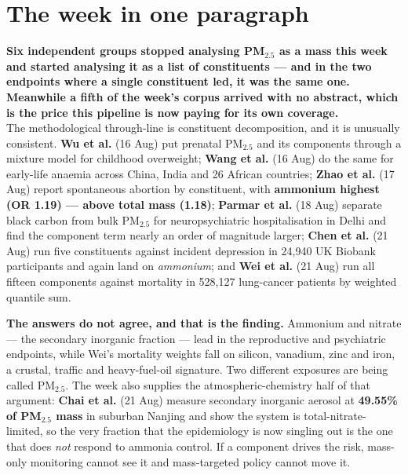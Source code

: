 \documentclass[10pt]{article}
\begin{document}
\vspace{6mm}

\section*{\sffamily\bfseries\color{Deep}The week in one paragraph}
\vspace{-1.5mm}{\color{Teal}\rule{\linewidth}{1.1pt}}\vspace{2.5mm}

\begin{keybox}
{\sffamily\bfseries\small\color{Deep}Six independent groups stopped analysing PM$_{2.5}$
as a mass this week and started analysing it as a list of constituents --- and in the two
endpoints where a single constituent led, it was the same one. Meanwhile a fifth of the
week's corpus arrived with no abstract, which is the price this pipeline is now paying for
its own coverage.}\\[1.4mm]
\footnotesize
The methodological through-line is constituent decomposition, and it is unusually
consistent. \textbf{Wu et al.} (16 Aug) put prenatal PM$_{2.5}$ and its components through
a mixture model for childhood overweight; \textbf{Wang et al.} (16 Aug) do the same for
early-life anaemia across China, India and 26 African countries; \textbf{Zhao et al.}
(17 Aug) report spontaneous abortion by constituent, with \textbf{ammonium highest
(OR 1.19) --- above total mass (1.18)}; \textbf{Parmar et al.} (18 Aug) separate black
carbon from bulk PM$_{2.5}$ for neuropsychiatric hospitalisation in Delhi and find the
component term nearly an order of magnitude larger; \textbf{Chen et al.} (21 Aug) run
five constituents against incident depression in 24{,}940 UK Biobank participants and
again land on \emph{ammonium}; and \textbf{Wei et al.} (21 Aug) run all fifteen components
against mortality in 528{,}127 lung-cancer patients by weighted quantile sum.

\textbf{The answers do not agree, and that is the finding.} Ammonium and nitrate --- the
secondary inorganic fraction --- lead in the reproductive and psychiatric endpoints, while
Wei's mortality weights fall on silicon, vanadium, zinc and iron, a crustal, traffic and
heavy-fuel-oil signature. Two different exposures are being called PM$_{2.5}$. The week
also supplies the atmospheric-chemistry half of that argument: \textbf{Chai et al.}
(21 Aug) measure secondary inorganic aerosol at \textbf{49.55\% of PM$_{2.5}$ mass} in
suburban Nanjing and show the system is total-nitrate-limited, so the very fraction that
the epidemiology is now singling out is the one that does \emph{not} respond to ammonia
control. If a component drives the risk, mass-only monitoring cannot see it and
mass-targeted policy cannot move it.


\end{keybox}
\end{document}
